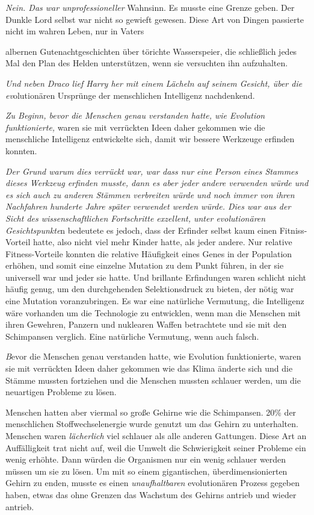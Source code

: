 {\emph{Nein. Das war unprofessioneller} Wahnsinn. Es musste eine Grenze geben. Der Dunkle Lord selbst war nicht so gewieft gewesen. Diese Art von Dingen passierte nicht im wahren Leben, nur in Vaters

albernen Gutenachtgeschichten über törichte Wasserspeier, die schließlich jedes Mal den Plan des Helden unterstützen, wenn sie versuchten ihn aufzuhalten.

\emph{Und neben Draco lief Harry her mit einem Lächeln auf seinem Gesicht, über die ev}olutionären Ursprünge der menschlichen Intelligenz nachdenkend.

\emph{Zu Beginn, bevor die Menschen genau verstanden hatte, wie Evolution funktionierte,} waren sie mit verrückten Ideen daher gekommen wie die menschliche Intelligenz entwickelte sich, damit wir bessere Werkzeuge erfinden konnten.

\emph{Der Grund warum dies verrückt war, war dass nur eine Person eines Stammes dieses Werkzeug erfinden musste, dann es aber jeder andere verwenden würde und es sich auch zu anderen Stämmen verbreiten würde und noch immer von ihren Nachfahren hunderte Jahre später verwendet werden würde. Dies war aus der Sicht des wissenschaftlichen Fortschritte exzellent, unter evolutionären Gesichtspunkte}n bedeutete es jedoch, dass der Erfinder selbst kaum einen Fitniss-Vorteil hatte, also nicht viel mehr Kinder hatte, als jeder andere. Nur relative Fitness-Vorteile konnten die relative Häufigkeit eines Genes in der Population erhöhen, und somit eine einzelne Mutation zu dem Punkt führen, in der sie universell war und jeder sie hatte. Und brillante Erfindungen waren schlicht nicht häufig genug, um den durchgehenden Selektionsdruck zu bieten, der nötig war eine Mutation voranzubringen. Es war eine natürliche Vermutung, die Intelligenz wäre vorhanden um die Technologie zu entwicklen, wenn man die Menschen mit ihren Gewehren, Panzern und nuklearen Waffen betrachtete und sie mit den Schimpansen verglich. Eine natürliche Vermutung, wenn auch falsch.

\emph{B}evor die Menschen genau verstanden hatte, wie Evolution funktionierte, waren sie mit verrückten Ideen daher gekommen wie das Klima änderte sich und die Stämme mussten fortziehen und die Menschen mussten schlauer werden, um die neuartigen Probleme zu lösen.

Menschen hatten aber viermal so große Gehirne wie die Schimpansen. 20\% der menschlichen Stoffwechselenergie wurde genutzt um das Gehirn zu unterhalten. Menschen waren \emph{lächerlich} viel schlauer als alle anderen Gattungen. Diese Art an Auffälligkeit trat nicht auf, weil die Umwelt die Schwierigkeit seiner Probleme ein wenig erhöhte. Dann würden die Organismen nur ein wenig schlauer werden müssen um sie zu lösen. Um mit so einem gigantischen, überdimensionierten Gehirn zu enden, musste es einen \emph{unaufhaltbaren} evolutionären Prozess gegeben haben, etwas das ohne Grenzen das Wachstum des Gehirns antrieb und wieder antrieb.

}
